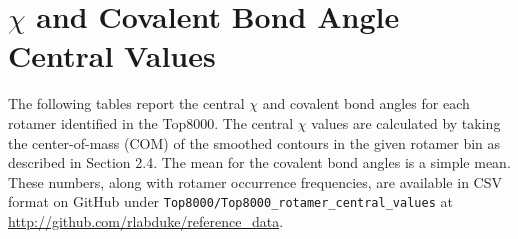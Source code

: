 \section*{$\chi$ and Covalent Bond Angle Central Values}
The following tables report the central $\chi$ and covalent bond angles for each rotamer identified in the Top8000. The central $\chi$ values are calculated by taking the center-of-mass (COM) of the smoothed contours in the given rotamer bin as described in Section 2.4. The mean for the covalent bond angles is a simple mean. These numbers, along with rotamer occurrence frequencies, are available in CSV format on GitHub under \texttt{Top8000/Top8000\_rotamer\_central\_values} at \url{http://github.com/rlabduke/reference_data}.


\begin{longtable}{ c c }


\end{longtable}
